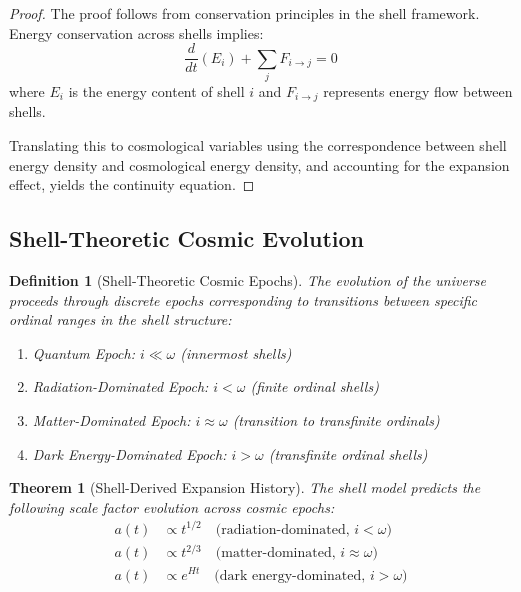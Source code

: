 \documentclass[12pt,a4paper]{article}
\newtheorem{theorem}{Theorem}[section]
\newtheorem{definition}{Definition}[section]
\begin{document}
\begin{proof}
The proof follows from conservation principles in the shell framework. Energy conservation across shells implies:
\begin{equation}
\frac{d}{dt}(E_i) + \sum_j F_{i \to j} = 0
\end{equation}
where $E_i$ is the energy content of shell $i$ and $F_{i \to j}$ represents energy flow between shells.

Translating this to cosmological variables using the correspondence between shell energy density and cosmological energy density, and accounting for the expansion effect, yields the continuity equation.
\end{proof}

\subsection{Shell-Theoretic Cosmic Evolution}
\label{subsec:cosmic-evolution}

\begin{definition}[Shell-Theoretic Cosmic Epochs]
\label{def:cosmic-epochs}
The evolution of the universe proceeds through discrete epochs corresponding to transitions between specific ordinal ranges in the shell structure:
\begin{enumerate}
    \item Quantum Epoch: $i \ll \omega$ (innermost shells)
    \item Radiation-Dominated Epoch: $i < \omega$ (finite ordinal shells)
    \item Matter-Dominated Epoch: $i \approx \omega$ (transition to transfinite ordinals)
    \item Dark Energy-Dominated Epoch: $i > \omega$ (transfinite ordinal shells)
\end{enumerate}
\end{definition}

\begin{theorem}[Shell-Derived Expansion History]
\label{thm:expansion-history}
The shell model predicts the following scale factor evolution across cosmic epochs:
\begin{align}
a(t) &\propto t^{1/2} \quad \text{(radiation-dominated, } i < \omega\text{)} \\
a(t) &\propto t^{2/3} \quad \text{(matter-dominated, } i \approx \omega\text{)} \\
a(t) &\propto e^{Ht} \quad \text{(dark energy-dominated, } i > \omega\text{)}
\end{align}
\end{theorem}
\end{document}

